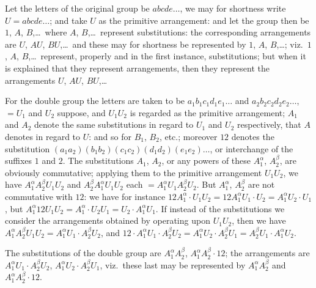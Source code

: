 \documentclass[11pt,a4paper]{book}
\begin{document}
Let the letters of the original group be $abcde\ldots$, we may for shortness write $U = abcde\ldots$; and take $U$ as the primitive arrangement: and let the group then be $1$, $A$, $B$,\ldots\ where $A$, $B$,\ldots\ represent substitutions: the corresponding arrangements are $U$, $AU$, $BU$,\ldots\ and these may for shortness be represented by $1$, $A$, $B$,\ldots; viz.~$1$, $A$, $B$,\ldots\ represent, properly and in the first instance, substitutions; but when it is explained that they represent arrangements, then they represent the arrangements $U$, $AU$, $BU$,\ldots

For the double group the letters are taken to be $a_1 b_1 c_1 d_1 e_1 \ldots$ and $a_2 b_2 c_2 d_2 e_2 \ldots$, $= U_1$ and $U_2$ suppose, and $U_1 U_2$ is regarded as the primitive arrangement; $A_1$ and $A_2$ denote the same substitutions in regard to $U_1$ and $U_2$ respectively, that $A$ denotes in regard to $U$: and so for $B_1$, $B_2$, etc.; moreover $12$ denotes the substitution $(a_1 a_2)(b_1 b_2)(c_1 c_2)(d_1 d_2)(e_1 e_2)\ldots$, or interchange of the suffixes $1$ and $2$. The substitutions $A_1$, $A_2$, or any powers of these $A_1^\alpha$, $A_2^\beta$, are obviously commutative; applying them to the primitive arrangement $U_1 U_2$, we have $A_1^\alpha A_2^\beta U_1 U_2$ and $A_2^\beta A_1^\alpha U_1 U_2$ each $= A_1^\alpha U_1 A_2^\beta U_2$. But $A_1^\alpha$, $A_2^\beta$ are not commutative with $12$: we have for instance $12 A_1^\alpha \cdot U_1 U_2 = 12 A_1^\alpha U_1 \cdot U_2 = A_1^\alpha U_2 \cdot U_1$, but $A_1^\alpha 12 U_1 U_2 = A_1^\alpha \cdot U_2 U_1 = U_2 \cdot A_1^\alpha U_1$. If instead of the substitutions we consider the arrangements obtained by operating upon $U_1 U_2$, then we have $A_1^\alpha A_2^\beta U_1 U_2 = A_1^\alpha U_1 \cdot A_2^\beta U_2$, and $12 \cdot A_1^\alpha U_1 \cdot A_2^\beta U_2 = A_1^\alpha U_2 \cdot A_2^\beta U_1 = A_2^\beta U_1 \cdot A_1^\alpha U_2$.

The substitutions of the double group are $A_1^\alpha A_2^\beta$, $A_1^\alpha A_2^\beta \cdot 12$; the arrangements are $A_1^\alpha U_1 \cdot A_2^\beta U_2$, $A_1^\alpha U_2 \cdot A_2^\beta U_1$, viz.~these last may be represented by $A_1^\alpha A_2^\beta$ and $A_1^\alpha A_2^\beta \cdot 12$.
\end{document}
